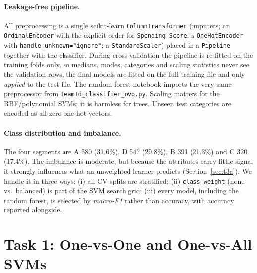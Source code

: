 \documentclass[11pt]{article}
\begin{document}
\paragraph{Leakage-free pipeline.} All preprocessing is a single scikit-learn
\texttt{ColumnTransformer} (imputers; an \texttt{OrdinalEncoder} with the explicit order for
\texttt{Spending\_Score}; a \texttt{OneHotEncoder} with \texttt{handle\_unknown="ignore"}; a
\texttt{StandardScaler})
placed in a \texttt{Pipeline} together with the classifier. During cross-validation the pipeline is
re-fitted on the training folds only, so medians, modes, categories and scaling statistics never see
the validation rows; the final models are fitted on the full training file and only \emph{applied}
to the test file. The random forest notebook imports the very same preprocessor from
\texttt{teamId\_classifier\_ovo.py}. Scaling matters for the RBF/polynomial SVMs; it is harmless for
trees. Unseen test categories are encoded as all-zero one-hot vectors.

\paragraph{Class distribution and imbalance.} The four segments are A 580 (31.6\%), D 547 (29.8\%),
B 391 (21.3\%) and C 320 (17.4\%). The imbalance is moderate, but because the attributes carry
little signal it strongly influences what an unweighted learner predicts (Section~\ref{sec:t3a}).
We handle it in three ways: (i) all CV splits are stratified; (ii) \texttt{class\_weight} (none
vs.\ balanced) is part of the SVM search grid; (iii) every model, including the random forest, is
selected by \emph{macro-F1} rather than accuracy, with accuracy reported alongside.

\section{Task 1: One-vs-One and One-vs-All SVMs}
\end{document}
